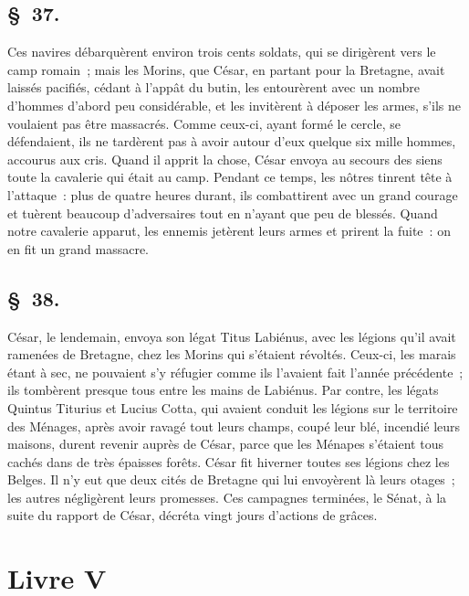 \documentclass[french,twoside]{book} %
\begin{document}
\subsection[{§ 37.}]{ \textsc{§ 37.} }
\noindent Ces navires débarquèrent environ trois cents soldats, qui se dirigèrent vers le camp romain ; mais les Morins, que César, en partant pour la Bretagne, avait laissés pacifiés, cédant à l’appât du butin, les entourèrent avec un nombre d’hommes d’abord peu considérable, et les invitèrent à déposer les armes, s’ils ne voulaient pas être massacrés. Comme ceux-ci, ayant formé le cercle, se défendaient, ils ne tardèrent pas à avoir autour d’eux quelque six mille hommes, accourus aux cris. Quand il apprit la chose, César envoya au secours des siens toute la cavalerie qui était au camp. Pendant ce temps, les nôtres tinrent tête à l’attaque : plus de quatre heures durant, ils combattirent avec un grand courage et tuèrent beaucoup d’adversaires tout en n’ayant que peu de blessés. Quand notre cavalerie apparut, les ennemis jetèrent leurs armes et prirent la fuite : on en fit un grand massacre.
\subsection[{§ 38.}]{ \textsc{§ 38.} }
\noindent César, le lendemain, envoya son légat Titus Labiénus, avec les légions qu’il avait ramenées de Bretagne, chez les Morins qui s’étaient révoltés. Ceux-ci, les marais étant à sec, ne pouvaient s’y réfugier comme ils l’avaient fait l’année précédente ; ils tombèrent presque tous entre les mains de Labiénus. Par contre, les légats Quintus Titurius et Lucius Cotta, qui avaient conduit les légions sur le territoire des Ménages, après avoir ravagé tout leurs champs, coupé leur blé, incendié leurs maisons, durent revenir auprès de César, parce que les Ménapes s’étaient tous cachés dans de très épaisses forêts. César fit hiverner toutes ses légions chez les Belges. Il n’y eut que deux cités de Bretagne qui lui envoyèrent là leurs otages ; les autres négligèrent leurs promesses. Ces campagnes terminées, le Sénat, à la suite du rapport de César, décréta vingt jours d’actions de grâces.
 \section[{Livre V}]{Livre V}\renewcommand{\leftmark}{Livre V}
\end{document}
